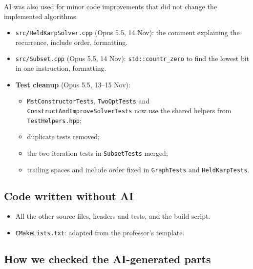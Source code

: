 \documentclass[10pt,a4paper]{article}
\begin{document}
AI was also used for minor code improvements that did not change the implemented algorithms.

\begin{itemize}
    \item \texttt{src/HeldKarpSolver.cpp} (Opus 5.5, 14 Nov): the comment explaining the recurrence, include order, formatting.

    \item \texttt{src/Subset.cpp} (Opus 5.5, 14 Nov): \texttt{std::countr\_zero} to find the lowest bit in one instruction, formatting.

    \item \textbf{Test cleanup} (Opus 5.5, 13--15 Nov):
    \begin{itemize}
        \item \texttt{MstConstructorTests}, \texttt{TwoOptTests} and \texttt{ConstructAndImproveSolverTests} now use the shared helpers from \texttt{TestHelpers.hpp};
        \item duplicate tests removed;
        \item the two iteration tests in \texttt{SubsetTests} merged;
        \item trailing spaces and include order fixed in \texttt{GraphTests} and \texttt{HeldKarpTests}.
    \end{itemize}
\end{itemize}

\subsection*{Code written without AI}

\begin{itemize}
    \item All the other source files, headers and tests, and the build script.
    \item \texttt{CMakeLists.txt}: adapted from the professor's template.
\end{itemize}

\subsection*{How we checked the AI-generated parts}
\end{document}
